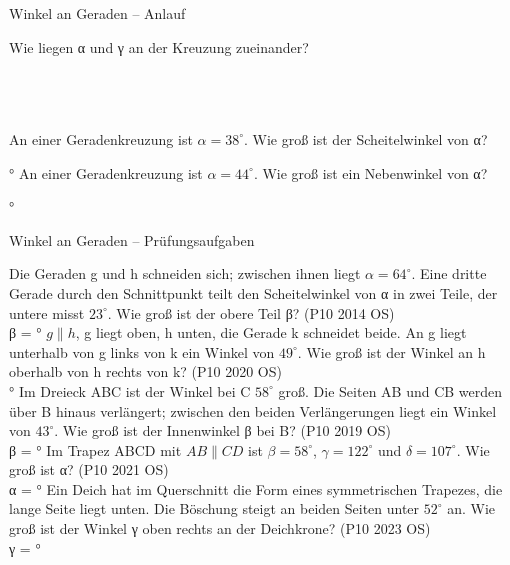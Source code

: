 \begin{aufgabe}{Winkel an Geraden – Anlauf}
\begin{teile}
\teil Wie liegen α und γ an der Kreuzung zueinander? \\  \\  \\  \\ 

\teil An einer Geradenkreuzung ist $\alpha = 38^\circ$. Wie groß ist der Scheitelwinkel von α?

\leerfeld °
\teil An einer Geradenkreuzung ist $\alpha = 44^\circ$. Wie groß ist ein Nebenwinkel von α?

\leerfeld °
\end{teile}
\end{aufgabe}

\begin{aufgabe}{Winkel an Geraden – Prüfungsaufgaben}
\begin{teile}
\teil Die Geraden g und h schneiden sich; zwischen ihnen liegt $\alpha = 64^\circ$. Eine dritte Gerade durch den Schnittpunkt teilt den Scheitelwinkel von α in zwei Teile, der untere misst $23^\circ$. Wie groß ist der obere Teil β? \hfill (P10 2014 OS) \\ β = \leerfeld °
\teil $g \parallel h$, g liegt oben, h unten, die Gerade k schneidet beide. An g liegt unterhalb von g links von k ein Winkel von $49^\circ$. Wie groß ist der Winkel an h oberhalb von h rechts von k? \hfill (P10 2020 OS) \\

\leerfeld °
\teil Im Dreieck ABC ist der Winkel bei C $58^\circ$ groß. Die Seiten AB und CB werden über B hinaus verlängert; zwischen den beiden Verlängerungen liegt ein Winkel von $43^\circ$. Wie groß ist der Innenwinkel β bei B? \hfill (P10 2019 OS) \\ β = \leerfeld °
\teil Im Trapez ABCD mit $AB \parallel CD$ ist $\beta = 58^\circ$, $\gamma = 122^\circ$ und $\delta = 107^\circ$. Wie groß ist α? \hfill (P10 2021 OS) \\

α = \leerfeld °
\teil Ein Deich hat im Querschnitt die Form eines symmetrischen Trapezes, die lange Seite liegt unten. Die Böschung steigt an beiden Seiten unter $52^\circ$ an. Wie groß ist der Winkel γ oben rechts an der Deichkrone? \hfill (P10 2023 OS) \\

γ = \leerfeld °
\end{teile}
\end{aufgabe}


